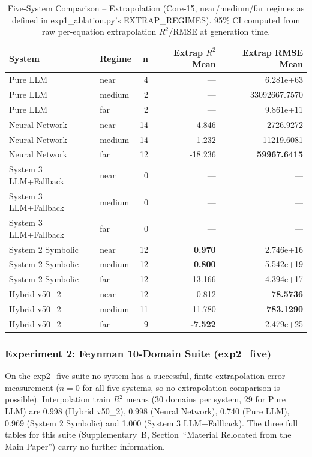 \documentclass[twoside,11pt]{article}
\begin{document}
\begin{table}[t]
\centering
\caption{Five-System Comparison -- Extrapolation (Core-15, near/medium/far
  regimes as defined in exp1\_ablation.py's EXTRAP\_REGIMES).
  95\% CI computed from raw per-equation extrapolation $R^2$/RMSE at
  generation time.}
\label{tab:five_systems_extrapolation}
\begin{tabular}{llrrr}
\toprule
\textbf{System} & \textbf{Regime} & \textbf{n}
  & \textbf{Extrap $R^2$ Mean} & \textbf{Extrap RMSE Mean} \\
\midrule
Pure LLM & near & 4 & --- & 6.281e+63 \\
Pure LLM & medium & 2 & --- & 33092667.7570 \\
Pure LLM & far & 2 & --- & 9.861e+11 \\
Neural Network & near & 14 & -4.846 & 2726.9272 \\
Neural Network & medium & 14 & -1.232 & 11219.6081 \\
Neural Network & far & 12 & -18.236 & \textbf{59967.6415} \\
System 3 LLM+Fallback & near & 0 & --- & --- \\
System 3 LLM+Fallback & medium & 0 & --- & --- \\
System 3 LLM+Fallback & far & 0 & --- & --- \\
System 2 Symbolic & near & 12 & \textbf{0.970} & 2.746e+16 \\
System 2 Symbolic & medium & 12 & \textbf{0.800} & 5.542e+19 \\
System 2 Symbolic & far & 12 & -13.166 & 4.394e+17 \\
Hybrid v50\_2 & near & 12 & 0.812 & \textbf{78.5736} \\
Hybrid v50\_2 & medium & 11 & -11.780 & \textbf{783.1290} \\
Hybrid v50\_2 & far & 9 & \textbf{-7.522} & 2.479e+25 \\
\bottomrule
\end{tabular}
\end{table}

\subsubsection{Experiment 2: Feynman 10-Domain Suite (exp2\_five)}\label{subsubsec:five-system-exp2}

On the exp2\_five suite no system has a successful, finite extrapolation-error measurement ($n=0$ for all five systems, so no extrapolation comparison is possible). Interpolation train $R^2$ means (30 domains per system, 29 for Pure LLM) are 0.998 (Hybrid v50\_2), 0.998 (Neural Network), 0.740 (Pure LLM), 0.969 (System 2 Symbolic) and 1.000 (System 3 LLM+Fallback). The three full tables for this suite (Supplementary~B, Section~``Material Relocated from the Main Paper'') carry no further information.
\end{document}
